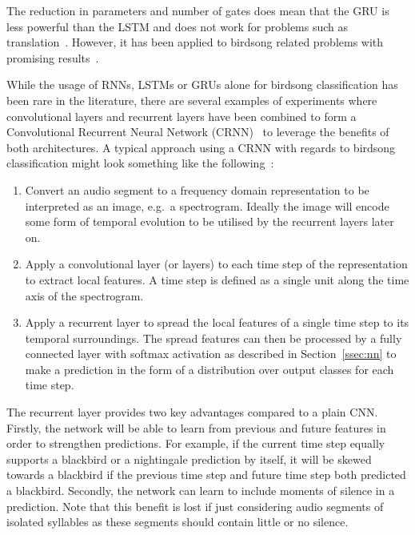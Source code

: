 The reduction in parameters and number of gates does mean that the GRU is less
powerful than the LSTM and does not work for problems such as
translation~\cite{britz2017massive}. However, it has been applied to birdsong
related problems with promising
results~\cite{parrilla2022polyphonic,adavanne2017stacked}.

While the usage of RNNs, LSTMs or GRUs alone for birdsong classification has
been rare in the literature, there are several examples of experiments where
convolutional layers and recurrent layers have been combined to form a
Convolutional Recurrent Neural Network
(CRNN)~\cite{yan2021birdsong,mukherjee2018convolutional} to leverage
the benefits of both architectures. A typical approach using a CRNN with regards
to birdsong classification might look something like the
following~\cite{crous2019polyphonic}:

\begin{enumerate}

  \item Convert an audio segment to a frequency domain representation to be
    interpreted as an image, e.g.\ a spectrogram. Ideally the image will encode
    some form of temporal evolution to be utilised by the recurrent layers later
    on.

  \item Apply a convolutional layer (or layers) to each time step of the
    representation to extract local features. A time step is defined as
    a single unit along the time axis of the spectrogram.

  \item Apply a recurrent layer to spread the local features of a single time
    step to its temporal surroundings. The spread features can then be processed
    by a fully connected layer with softmax activation as described in
    Section~\ref{ssec:nn} to make a prediction in the form of a distribution
    over output classes for each time step.

\end{enumerate}

The recurrent layer provides two key advantages compared to a plain CNN\@.
Firstly, the network will be able to learn from previous and future features in
order to strengthen predictions. For example, if the current time step equally
supports a blackbird or a nightingale prediction by itself, it will be skewed
towards a blackbird if the previous time step and future time step both
predicted a blackbird. Secondly, the network can learn to include moments of
silence in a prediction. Note that this benefit is lost if just considering
audio segments of isolated syllables as these segments should contain little or
no silence.
